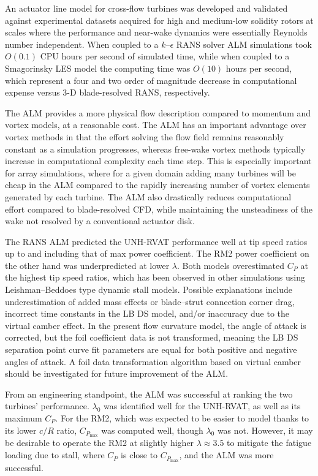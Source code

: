 An actuator line model for cross-flow turbines was developed and validated
against experimental datasets acquired for high and medium-low solidity rotors
at scales where the performance and near-wake dynamics were essentially Reynolds
number independent. When coupled to a $k$--$\epsilon$ RANS solver ALM
simulations took $O(0.1)$ CPU hours per second of simulated time, while when
coupled to a Smagorinsky LES model the computing time was $O(10)$ hours per
second, which represent a four and two order of magnitude decrease in
computational expense versus 3-D blade-resolved RANS, respectively.

The ALM provides a more physical flow description compared to momentum and
vortex models, at a reasonable cost. The ALM has an important advantage over
vortex methods in that the effort solving the flow field remains reasonably
constant as a simulation progresses, whereas free-wake vortex methods typically
increase in computational complexity each time step. This is especially
important for array simulations, where for a given domain adding many turbines
will be cheap in the ALM compared to the rapidly increasing number of vortex
elements generated by each turbine. The ALM also drastically reduces
computational effort compared to blade-resolved CFD, while maintaining the
unsteadiness of the wake not resolved by a conventional actuator disk.

The RANS ALM predicted the UNH-RVAT performance well at tip speed ratios up to
and including that of max power coefficient. The RM2 power coefficient on the
other hand was underpredicted at lower $\lambda$. Both models overestimated
$C_P$ at the highest tip speed ratios, which has been observed in other
simulations using Leishman--Beddoes type dynamic stall models. Possible
explanations include underestimation of added mass effects or blade--strut
connection corner drag, incorrect time constants in the LB DS model, and/or
inaccuracy due to the virtual camber effect. In the present flow curvature
model, the angle of attack is corrected, but the foil coefficient data is not
transformed, meaning the LB DS separation point curve fit parameters are equal
for both positive and negative angles of attack. A foil data transformation
algorithm based on virtual camber should be investigated for future improvement
of the ALM.

From an engineering standpoint, the ALM was successful at ranking the two
turbines' performance. $\lambda_0$ was identified well for the UNH-RVAT, as well
as its maximum $C_P$. For the RM2, which was expected to be easier to model
thanks to its lower $c/R$ ratio, $C_{P_{\max}}$ was computed well, though
$\lambda_0$ was not. However, it may be desirable to operate the RM2 at slightly
higher $\lambda \approx 3.5$ to mitigate the fatigue loading due to stall, where
$C_P$ is close to $C_{P_{\max}}$, and the ALM was more successful.

